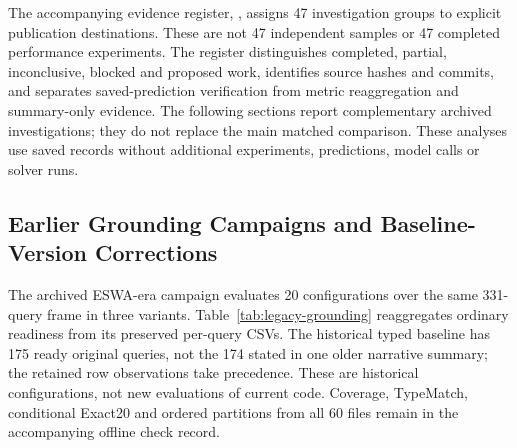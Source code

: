 The accompanying evidence register, , assigns 47 investigation groups to explicit publication destinations. These are not 47 independent samples or 47 completed performance experiments. The register distinguishes completed, partial, inconclusive, blocked and proposed work, identifies source hashes and commits, and separates saved-prediction verification from metric reaggregation and summary-only evidence. The following sections report complementary archived investigations; they do not replace the main matched comparison. These analyses use saved records without additional experiments, predictions, model calls or solver runs.

\subsection{Earlier Grounding Campaigns and Baseline-Version Corrections}
The archived ESWA-era campaign evaluates 20 configurations over the same 331-query frame in three variants. Table~\ref{tab:legacy-grounding} reaggregates ordinary readiness from its preserved per-query CSVs. The historical typed baseline has 175 ready original queries, not the 174 stated in one older narrative summary; the retained row observations take precedence. These are historical configurations, not new evaluations of current code. Coverage, TypeMatch, conditional Exact20 and ordered partitions from all 60 files remain in the accompanying offline check record.

